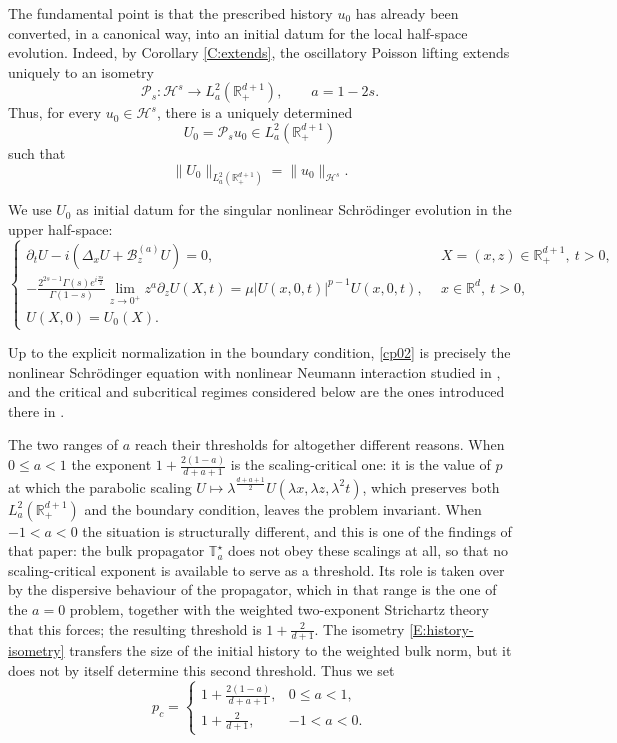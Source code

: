 \documentclass[11pt,letter]{amsart}
\def \RN {\mathbb{R}_+^{d+1}}
\newcommand{\Ba}{\mathscr B_z^{(a)}}
\newcommand{\Rd}{\mathbb R^d}
\newcommand{\p}{\partial}
\newcommand{\la}{\lambda}
\numberwithin{equation}{section}
\numberwithin{equation}{section}
\begin{document}
The fundamental point is that the prescribed history \(u_0\) has
already been converted, in a canonical way, into an initial datum for
the local half-space evolution. Indeed, by Corollary
\ref{C:extends}, the oscillatory Poisson lifting extends uniquely to
an isometry
\[
\mathcal P_s:\mathcal H^s
\longrightarrow
L_a^2(\RN),
\qquad a=1-2s.
\]
Thus, for every \(u_0\in\mathcal H^s\), there is a uniquely determined
\[
U_0=\mathcal P_su_0\in L_a^2(\RN)
\]
such that
\begin{equation}\label{E:history-isometry}
\|U_0\|_{L_a^2(\RN)}
=
\|u_0\|_{\mathcal H^s}.
\end{equation}

We use \(U_0\) as initial datum for the  singular
nonlinear Schr\"odinger evolution in the upper half-space:
\begin{equation}\label{cp02}
\begin{cases}
\p_t U - i(\Delta_x U + \Ba U) = 0, & \ \ X=(x,z)\in \mathbb{R}^{d+1}_+,\ t>0, \\
-\frac{2^{2s-1}\Gamma(s)e^{i \frac{\pi s}2}}
{\Gamma(1-s)} \displaystyle \lim_{z\to 0^+} z^a \p_z U(X,t) = \mu |U(x,0,t)|^{p-1}U(x,0,t), & \ \ x\in \Rd,\ t>0, \\
U(X,0)=U_0(X). 
\end{cases}
\end{equation}


Up to the explicit normalization in the boundary condition,
\eqref{cp02} is precisely the nonlinear Schr\"odinger equation with
nonlinear Neumann interaction studied in \cite{GS2}, and the critical and
subcritical regimes considered below are the ones introduced there in
\cite[Definition~2.7]{GS2}.

The two ranges of $a$ reach their thresholds for altogether different reasons.
When $0\le a<1$ the exponent $1+\frac{2(1-a)}{d+a+1}$ is the scaling-critical
one: it is the value of $p$ at which the parabolic scaling
$U\mapsto\la^{\frac{d+a+1}2}U(\la x,\la z,\la^2t)$, which preserves both
$L^2_a(\RN)$ and the boundary condition, leaves the problem invariant. When
$-1<a<0$ the situation is structurally different, and this is one of the
findings of that paper: the bulk propagator $\mathbb T^\star_a$ does not obey
these scalings at all, so that no scaling-critical exponent is available to
serve as a threshold. Its role is taken over by the dispersive behaviour of the
propagator, which in that range is the one of the $a=0$ problem, together with
the weighted two-exponent Strichartz theory that this forces; the resulting
threshold is $1+\frac{2}{d+1}$. The isometry \eqref{E:history-isometry}
transfers the size of the initial history to the weighted bulk norm, but it
does not by itself determine this second threshold. Thus we set
\begin{equation}\label{E:critical-exponents}
p_c=
\begin{cases}
\displaystyle
1+\frac{2(1-a)}{d+a+1},
& 0\leq a<1,
\\[3mm]
\displaystyle
1+\frac{2}{d+1},
& -1<a<0.
\end{cases}
\end{equation}
\end{document}
